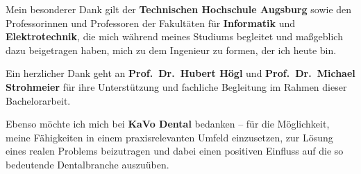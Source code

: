 Mein besonderer Dank gilt der \textbf{Technischen Hochschule Augsburg} sowie den Professorinnen und Professoren der Fakultäten für \textbf{Informatik} und \textbf{Elektrotechnik}, die mich während meines Studiums begleitet und maßgeblich dazu beigetragen haben, mich zu dem Ingenieur zu formen, der ich heute bin.

Ein herzlicher Dank geht an \textbf{Prof.~Dr.~Hubert Högl} und \textbf{Prof.~Dr.~Michael Strohmeier} für ihre Unterstützung und fachliche Begleitung im Rahmen dieser Bachelorarbeit.

Ebenso möchte ich mich bei \textbf{KaVo Dental} bedanken – für die Möglichkeit, meine Fähigkeiten in einem praxisrelevanten Umfeld einzusetzen, zur Lösung eines realen Problems beizutragen und dabei einen positiven Einfluss auf die so bedeutende Dentalbranche auszuüben.
